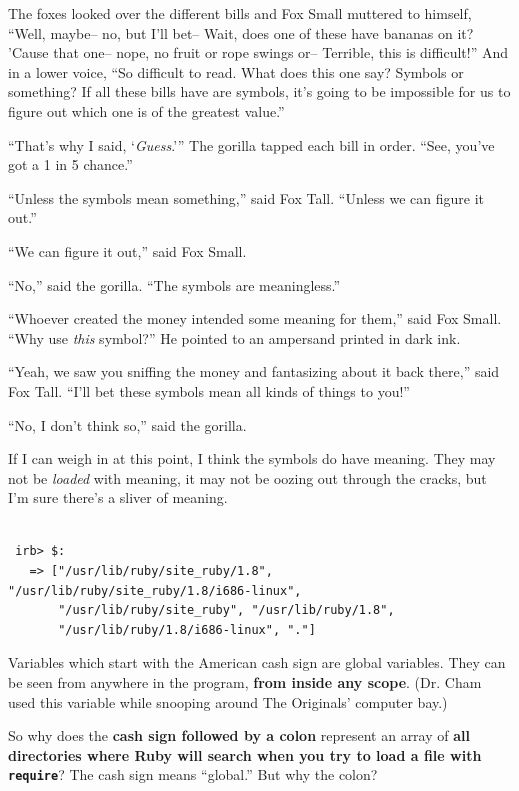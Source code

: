 \documentclass[10pt,twoside]{report}
\begin{document}
The foxes looked over the different bills and Fox Small muttered to
himself, ``Well, maybe-- no, but I'll bet-- Wait, does one of these
have bananas on it?  'Cause that one-- nope, no fruit or rope swings
or-- Terrible, this is difficult!''  And in a lower voice, ``So
difficult to read.  What does this one say?  Symbols or something? If
all these bills have are symbols, it's going to be impossible for us
to figure out which one is of the greatest value.''

``That's why I said, `{\em Guess}.'''  The gorilla tapped each bill in
order.  ``See, you've got a 1 in 5 chance.''

``Unless the symbols mean something,'' said Fox Tall.  ``Unless we can
figure it out.''

``We can figure it out,'' said Fox Small.

``No,'' said the gorilla.  ``The symbols are meaningless.''

``Whoever created the money intended some meaning for them,'' said Fox
Small.  ``Why use {\em this} symbol?''  He pointed to an ampersand
printed in dark ink.

``Yeah, we saw you sniffing the money and fantasizing about it back
there,'' said Fox Tall.  ``I'll bet these symbols mean all kinds of
things to you!''

``No, I don't think so,'' said the gorilla.

If I can weigh in at this point, I think the symbols do have meaning.
They may not be {\em loaded} with meaning, it may not be oozing out
through the cracks, but I'm sure there's a sliver of meaning.


\begin{lstlisting}

 irb> $:
   => ["/usr/lib/ruby/site_ruby/1.8", "/usr/lib/ruby/site_ruby/1.8/i686-linux",
       "/usr/lib/ruby/site_ruby", "/usr/lib/ruby/1.8",
       "/usr/lib/ruby/1.8/i686-linux", "."]

\end{lstlisting}


Variables which start with the American cash sign are global
variables.  They can be seen from anywhere in the program, {\bf from
  inside any scope}.  (Dr. Cham used this variable while snooping
around The Originals' computer bay.)

So why does the {\bf cash sign followed by a colon} represent an array
of {\bf all directories where Ruby will search when you try to load a
  file with \lstinline[breaklines=true]|require|}?  The cash sign
means ``global.''  But why the colon?
\end{document}
